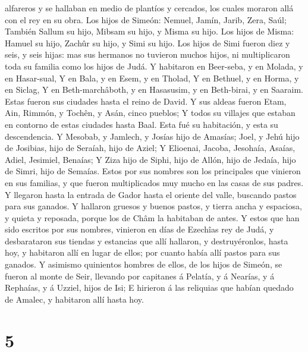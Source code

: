 alfareros y se hallaban en medio de plantíos y cercados, los cuales
moraron allá con el rey en su obra.  Los hijos de Simeón:
Nemuel, Jamín, Jarib, Zera, Saúl;  También Sallum su hijo,
Mibsam su hijo, y Misma su hijo.  Los hijos de Misma:
Hamuel su hijo, Zachûr su hijo, y Simi su hijo.  Los hijos
de Simi fueron diez y seis, y seis hijas: mas sus hermanos no tuvieron
muchos hijos, ni multiplicaron toda su familia como los hijos de Judá.
 Y habitaron en Beer-seba, y en Molada, y en Hasar-sual,
 Y en Bala, y en Esem, y en Tholad,  Y en
Bethuel, y en Horma, y en Siclag,  Y en Beth-marchâboth, y
en Hasasusim, y en Beth-birai, y en Saaraim. Estas fueron sus ciudades
hasta el reino de David.  Y sus aldeas fueron Etam, Ain,
Rimmón, y Tochên, y Asán, cinco pueblos;  Y todos su
villajes que estaban en contorno de estas ciudades hasta Baal. Esta fué
su habitación, y esta su descendencia.  Y Mesobab, y
Jamlech, y Josías hijo de Amasías;  Joel, y Jehú hijo de
Josibias, hijo de Seraíah, hijo de Aziel;  Y Elioenai,
Jacoba, Jesohaía, Asaías, Adiel, Jesimiel, Benaías;  Y Ziza
hijo de Siphi, hijo de Allón, hijo de Jedaía, hijo de Simri, hijo de
Semaías.  Estos por sus nombres son los principales que
vinieron en sus familias, y que fueron multiplicados muy mucho en las
casas de sus padres.  Y llegaron hasta la entrada de Gador
hasta el oriente del valle, buscando pastos para sus ganados.
 Y hallaron gruesos y buenos pastos, y tierra ancha y
espaciosa, y quieta y reposada, porque los de Châm la habitaban de
antes.  Y estos que han sido escritos por sus nombres,
vinieron en días de Ezechîas rey de Judá, y desbarataron sus tiendas y
estancias que allí hallaron, y destruyéronlos, hasta hoy, y habitaron
allí en lugar de ellos; por cuanto había allí pastos para sus ganados.
 Y asimismo quinientos hombres de ellos, de los hijos de
Simeón, se fueron al monte de Seir, llevando por capitanes á Pelatía, y
á Nearías, y á Rephaías, y á Uzziel, hijos de Isi;  E
hirieron á las reliquias que habían quedado de Amalec, y habitaron allí
hasta hoy.

\hypertarget{section-4}{%
\section{5}\label{section-4}}

